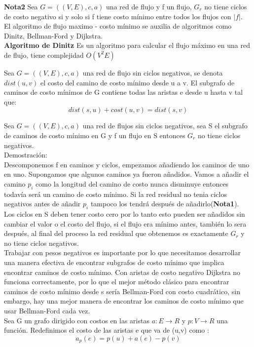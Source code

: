 \documentclass[sn-mathphys,Numbered]{sn-jnl}%
\theoremstyle{thmstyleone}%
\theoremstyle{thmstyletwo}%
\theoremstyle{thmstylethree}%
\begin{document}
\textbf{Nota2} Sea $G=((V,E),c,a)$ una red de flujo y f un flujo, $G_r$ no tiene ciclos de costo negativo si y solo si f tiene costo mínimo entre todos los flujos con $|f|$. \cite{4}\\


El algoritmo de flujo maximo - costo mínimo se auxilia de algoritmos como Dinitz, Bellman-Ford\cite{5} y Dijkstra\cite{6}.\\

\textbf{Algoritmo de Dinitz}
Es un algoritmo para calcular el flujo máximo en una red de flujo, tiene complejidad $O(V^2E)$\cite{7}\cite{4}


Sea $G=((V,E),c,a)$ una red de flujo sin ciclos negativos, se denota $dist(u,v)$ el costo del camino de costo mínimo desde u a v. El subgrafo de caminos de costo mínimos de G contiene todas las aristas e desde u hasta v tal que:
$$dist(s,u) + cost(u,v) = dist(s,v)$$

Sea $G=((V,E),c,a)$ una red de flujos sin ciclos negativos, sea S el subgrafo de caminos de costo mínimo en G y f un flujo en S entonces $G_r$ no tiene ciclos negativos.\\
Demostración: \\
Descomponemos f en caminos y ciclos, empezamos añadiendo los caminos de uno en uno. Supongamos que algunos caminos ya fueron añadidos. Vamos a añadir el camino $p_i$ como la longitud del camino de costo nunca disminuye entonces todavía ser\'a un camino de costo mínimo. Si la red residual no tenia ciclos negativos antes de añadir $p_i$ tampoco los tendrá después de añadirlo(\textbf{Nota1}).\\
Los ciclos en S deben tener costo cero por lo tanto esto pueden ser añadidos sin cambiar el valor o el costo del flujo, si el flujo era mínimo antes, también lo sera después, al final del proceso la red residual que obtenemos es exactamente $G_r$ y no tiene ciclos negativos.\\

Trabajar con pesos negativos es importante por lo que necesitamos desarrollar una manera efectiva de encontrar subgrafos de costo mínimo que implica encontrar caminos de costo mínimo. Con aristas de costo negativo Dijkstra no funciona correctamente, por lo que el mejor método clásico para encontrar caminos de costo mínimo desde s ser\'ia Bellman-Ford con costo cuadrático, sin embargo, hay una mejor manera de encontrar los caminos de costo mínimo que usar Bellman-Ford cada vez.\\

Sea G un grafo dirigido con costos en las aristas $a: E \rightarrow R$ y $p: V \rightarrow R$ una función. Redefinimos el costo de las aristas e que va de (u,v) como :
$$a_p(e) = p(u) +a(e) - p(v)$$
\end{document}
